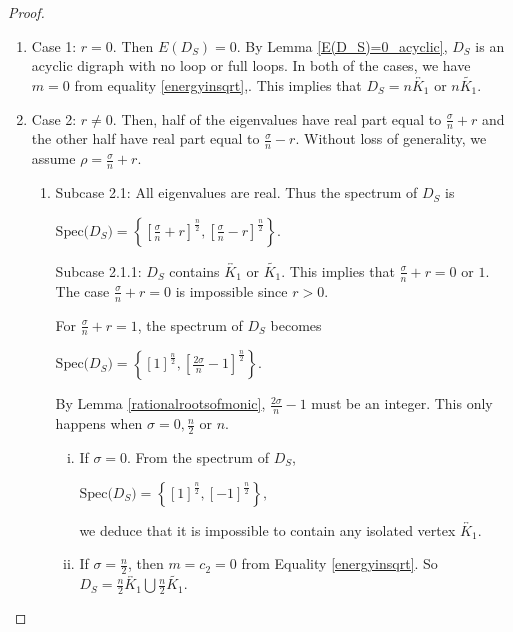 \documentclass[12pt,a4paper,reqno]{amsart}
\numberwithin{equation}{section}
\theoremstyle{plain}
\theoremstyle{definition}
\newcommand{\<}{\langle}
\renewcommand{\>}{\rangle}
\begin{document}
\begin{proof}
\begin{enumerate}
	\item Case 1: $r=0$. Then $E(D_S)=0$. By Lemma \ref{E(D_S)=0_acyclic}, $D_S$ is an acyclic digraph with no loop or full loops. In both of the cases,  we have $m=0$ from equality \eqref{energyinsqrt},. This implies that $D_S=n\overleftrightarrow{K_1}$ or $n\widetilde{K_1}$.

	\item Case 2: $r\neq 0$. Then, half of the eigenvalues have real part equal to $\frac{\sigma}{n}+r$ and the other half have real part equal to $\frac{\sigma}{n}-r$. Without loss of generality, we assume $\rho = \frac{\sigma}{n}+r$.
		\begin{enumerate}
			\item Subcase 2.1: All eigenvalues are real. Thus the spectrum of $D_S$ is 
			\begin{center}
				$\text{Spec($D_S$)}= \left\{  \left[\frac{\sigma}{n}+r \right] ^{\frac{n}{2}}, \left[ \frac{\sigma}{n}-r \right]^{\frac{n}{2}} \right\}.$
				
			\end{center}
            
			Subcase 2.1.1: $D_S$ contains $\overleftrightarrow{K_1}$ or $\widetilde{K_1}$. This implies that $\frac{\sigma}{n}+r = 0 \text{ or } 1$. The case $\frac{\sigma}{n}+r = 0$ is impossible since $r>0$.
			
			For $\frac{\sigma}{n}+r=1$, the spectrum of $D_S$ becomes 
			\begin{center}
				$\text{Spec($D_S$)}= \left\{  \left[1 \right] ^{\frac{n}{2}}, \left[ \frac{2\sigma}{n}-1 \right]^{\frac{n}{2}} \right\}.$
			\end{center}
			By Lemma \ref{rationalrootsofmonic}, $\frac{2\sigma}{n}-1$ must be an integer. This only happens when $\sigma = 0, \frac{n}{2} \text{ or } n$.
			\begin{enumerate}[i.]
				\item  If $\sigma=0$. From the spectrum of $D_S$, 
                \begin{center}
				$\text{Spec($D_S$)}= \left\{  \left[1 \right] ^{\frac{n}{2}}, \left[ -1 \right]^{\frac{n}{2}} \right\},$
			\end{center}
               we deduce that it is impossible to contain any isolated vertex $\overleftrightarrow{K_1}$.
                
				\item If $\sigma=\frac{n}{2}$, then $m=c_2=0$ from Equality \eqref{energyinsqrt}. So $D_S=\frac{n}{2} \overleftrightarrow{K_1} \bigcup \frac{n}{2} \widetilde{K_1}$.
                

\end{enumerate}
\end{enumerate}
\end{enumerate}
\end{proof}
\end{document}
